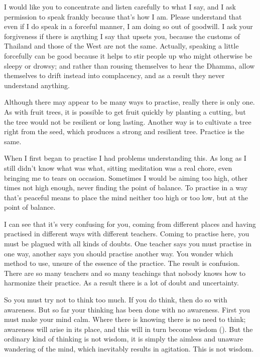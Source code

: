 I would like you to concentrate and listen carefully to what I say, and I ask permission to speak frankly because that's how I am. Please understand that even if I do speak in a forceful manner, I am doing so out of goodwill. I ask your forgiveness if there is anything I say that upsets you, because the customs of Thailand and those of the West are not the same. Actually, speaking a little forcefully can be good because it helps to stir people up who might otherwise be sleepy or drowsy; and rather than rousing themselves to hear the Dhamma, allow themselves to drift instead into complacency, and as a result they never understand anything.

Although there may appear to be many ways to practise, really there is only one. As with fruit trees, it is possible to get fruit quickly by planting a cutting, but the tree would not be resilient or long lasting. Another way is to cultivate a tree right from the seed, which produces a strong and resilient tree. Practice is the same.

When I first began to practise I had problems understanding this. As long as I still didn't know what was what, sitting meditation was a real chore, even bringing me to tears on occasion. Sometimes I would be aiming too high, other times not high enough, never finding the point of balance. To practise in a way that's peaceful means to place the mind neither too high or too low, but at the point of balance.

I can see that it's very confusing for you, coming from different places and having practised in different ways with different teachers. Coming to practise here, you must be plagued with all kinds of doubts. One teacher says you must practise in one way, another says you should practise another way. You wonder which method to use, unsure of the essence of the practice. The result is confusion. There are so many teachers and so many teachings that nobody knows how to harmonize their practice. As a result there is a lot of doubt and uncertainty.

So you must try not to think too much. If you do think, then do so with awareness. But so far your thinking has been done with no awareness. First you must make your mind calm. Where there is knowing there is no need to think; awareness will arise in its place, and this will in turn become wisdom (). But the ordinary kind of thinking is not wisdom, it is simply the aimless and unaware wandering of the mind, which inevitably results in agitation. This is not wisdom.

